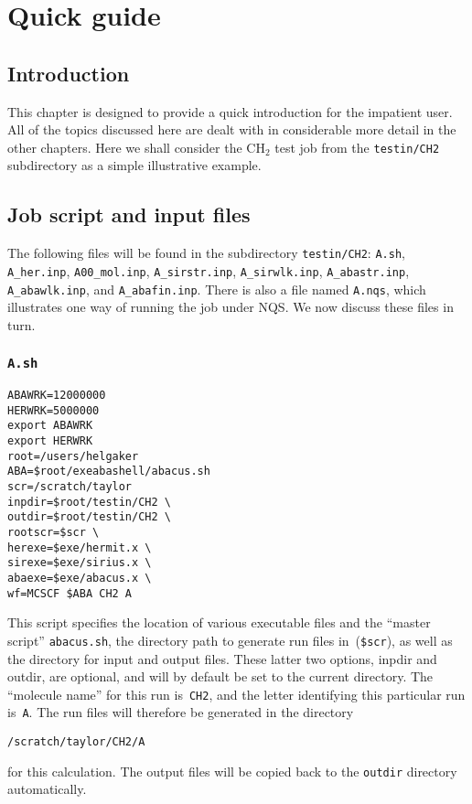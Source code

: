 \chapter{Quick guide}\label{ch:quick}

\section{Introduction}\label{sec:quickintro}

          This chapter is designed to provide a quick introduction for
the impatient user.  All of the topics discussed here are dealt with
in considerable more detail in the other chapters.  Here we shall
consider the CH$_2$ test job from the \verb|testin/CH2| subdirectory as a
simple illustrative example.

\section{Job script and input files}\label{sec:quickscr}

The following files will be found in the subdirectory
\verb|testin/CH2|: \verb|A.sh|, \verb|A_her.inp|, \newline
\verb|A00_mol.inp|,
\verb|A_sirstr.inp|, \verb|A_sirwlk.inp|, \verb|A_abastr.inp|,
\verb|A_abawlk.inp|, and \newline \verb|A_abafin.inp|.  There is also a file
named \verb|A.nqs|, which illustrates one way of running the job under
NQS. We now discuss these files in turn.

\subsection{{\tt A.sh}}

\begin{verbatim}
ABAWRK=12000000
HERWRK=5000000
export ABAWRK
export HERWRK
root=/users/helgaker
ABA=$root/exeabashell/abacus.sh
scr=/scratch/taylor
inpdir=$root/testin/CH2 \
outdir=$root/testin/CH2 \
rootscr=$scr \ 
herexe=$exe/hermit.x \ 
sirexe=$exe/sirius.x \ 
abaexe=$exe/abacus.x \ 
wf=MCSCF $ABA CH2 A
\end{verbatim}

This script specifies the location of various executable files and the
``master script'' \verb|abacus.sh|, the directory path to generate run
files in~(\verb|$scr|), as well as the directory for input and output
files. These latter two options, inpdir and outdir, are optional, and
will by default be set to the current directory. The ``molecule name''
for this run 
is~\verb|CH2|, and the letter identifying this particular run
is~\verb|A|.  The run files will therefore be generated in the directory
\begin{verbatim}
/scratch/taylor/CH2/A
\end{verbatim}
for this calculation.  The output files will be copied back to the
\verb|outdir| directory automatically.

